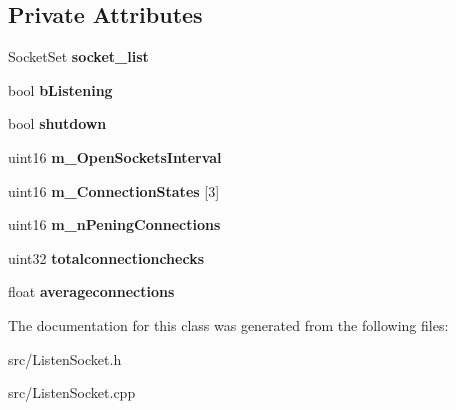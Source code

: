 \subsection*{Private Attributes}
\begin{DoxyCompactItemize}
\item 
SocketSet {\bfseries socket\_\-list}\label{classCListenSocket_a9ef9514b057ddb37e1cd4f5aac1f3dba}

\item 
bool {\bfseries bListening}\label{classCListenSocket_a7d52581efdbb621024b83c78ffbc1e33}

\item 
bool {\bfseries shutdown}\label{classCListenSocket_a601ef6db4db1b29c6fef4a3e6c42403b}

\item 
uint16 {\bfseries m\_\-OpenSocketsInterval}\label{classCListenSocket_a2c12abd1c7f4eb52bbda6a60c429c89c}

\item 
uint16 {\bfseries m\_\-ConnectionStates} [3]\label{classCListenSocket_ad552f68a06523742cb6c8551f1be4863}

\item 
uint16 {\bfseries m\_\-nPeningConnections}\label{classCListenSocket_a3281be80f5c7810132faba2646502565}

\item 
uint32 {\bfseries totalconnectionchecks}\label{classCListenSocket_a5404cbd780a30a9bd8f05198335dc66d}

\item 
float {\bfseries averageconnections}\label{classCListenSocket_a2a9a8ae7fb110a7a181b978437634774}

\end{DoxyCompactItemize}


The documentation for this class was generated from the following files:\begin{DoxyCompactItemize}
\item 
src/ListenSocket.h\item 
src/ListenSocket.cpp\end{DoxyCompactItemize}

